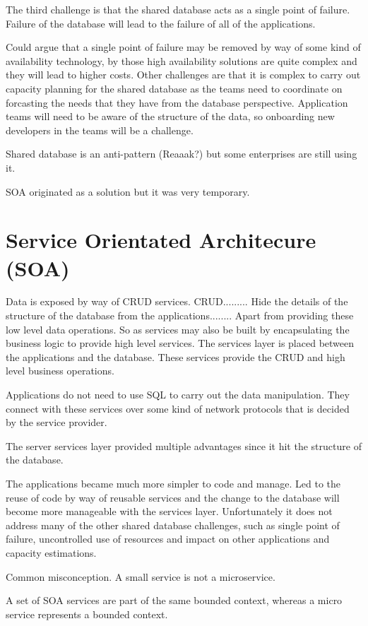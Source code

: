 The third challenge is that the shared database acts as a single point of failure.
Failure of the database will lead to the failure of all of the applications.

Could argue that a single point of failure may be removed by way of some kind of availability technology, by those high availability solutions are quite complex and they will lead to higher costs.
Other challenges are that it is complex to carry out capacity planning for the shared database as the teams need to coordinate on forcasting the needs that they have from the database perspective.
Application teams will need to be aware of the structure of the data, so onboarding new developers in the teams will be a challenge.

Shared database is an anti-pattern (Reaaak?) but some enterprises are still using it.

SOA originated as a solution but it was very temporary.

\section{Service Orientated Architecure (SOA)}
Data is exposed by way of CRUD services.
CRUD.........
Hide the details of the structure of the database from the applications........
Apart from providing these low level data operations.
So as services may also be built by encapsulating the business logic to provide high level services.
The services layer is placed between the applications and the database.
These services provide the CRUD and high level business operations.

Applications do not need to use SQL to carry out the data manipulation.
They connect with these services over some kind of network protocols that is decided by the service provider.

The server services layer provided multiple advantages since it hit the structure of the database.

The applications became much more simpler to code and manage.
Led to the reuse of code by way of reusable services and the change to the database will become more manageable with the services layer.
Unfortunately it does not address many of the other shared database challenges, such as single point of failure, uncontrolled use of resources and impact on other applications and capacity estimations.

Common misconception.
A small service is not a microservice.

A set of SOA services are part of the same bounded context, whereas a micro service represents a bounded context.

